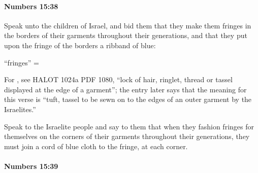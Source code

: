 		\paragraph{Numbers 15:38} %
			\label{NUMBERS-15-38}

			Speak unto the children of Israel, and bid them that they make them fringes in the borders of their garments throughout their generations, and that they put upon the fringe of the borders a ribband of blue:

			\begin{framed}
			\scriptsize
				\begin{compactdesc}
					\item[BHS] ``fringes'' = 
						\begin{compactenum}
							\item For , see HALOT 1024a PDF 1080, ``lock of hair, ringlet, thread or tassel displayed at the edge of a garment''; the entry later says that the meaning for this verse is ``tuft, tassel to be sewn on to the edges of an outer garment by the Israelites.''
						\end{compactenum}
					\item[AB 1993 388] Speak to the Israelite people and say to them that when they fashion fringes for themselves on the corners of their garments throughout their generations, they must join a cord of blue cloth to the fringe, at each corner.
				\end{compactdesc}
			\end{framed}

		\paragraph{Numbers 15:39} %
			\label{NUMBERS-15-39}

